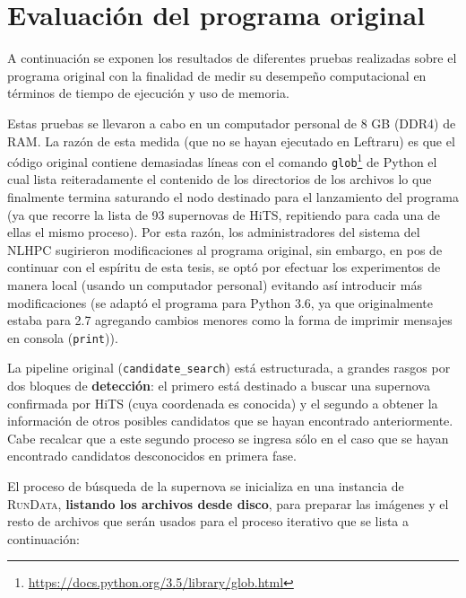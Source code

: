 \chapter{Evaluaci\'on del programa original}
\label{ch:prev_work}

A continuaci\'on se exponen los resultados de diferentes pruebas realizadas sobre el programa original con la finalidad de medir su desempe\~no computacional en t\'erminos de tiempo de ejecuci\'on y uso de memoria.
\bigskip

Estas pruebas se llevaron a cabo en un computador personal de 8 GB (DDR4) de RAM. La raz\'on de esta  medida (que no se hayan ejecutado en Leftraru) es que el c\'odigo original contiene demasiadas l\'ineas con el comando \texttt{glob}\footnote{\url{https://docs.python.org/3.5/library/glob.html}} de Python el cual lista reiteradamente el contenido de los directorios de los archivos lo que finalmente termina saturando el nodo destinado para el lanzamiento del programa (ya que recorre la lista de 93 supernovas de HiTS, repitiendo para cada una de ellas el mismo proceso). Por esta raz\'on, los administradores del sistema del NLHPC sugirieron modificaciones al programa original, sin embargo, en pos de continuar con el esp\'iritu de esta tesis, se opt\'o por efectuar los experimentos de manera local (usando un computador personal) evitando as\'i introducir m\'as modificaciones (se adapt\'o el programa para Python 3.6, ya que originalmente estaba para 2.7 agregando cambios menores como la forma de imprimir mensajes en consola (\texttt{print})).
\bigskip

La pipeline original (\texttt{candidate\_search}) est\'a estructurada, a grandes rasgos por dos bloques de \textbf{detecci\'on}: el primero est\'a destinado a buscar una supernova confirmada por HiTS (cuya coordenada es conocida) y el segundo a obtener la informaci\'on de otros posibles candidatos que se hayan encontrado anteriormente. Cabe recalcar que a este segundo proceso se ingresa s\'olo en el caso que se hayan encontrado candidatos desconocidos en primera fase.
\bigskip

El proceso de b\'usqueda de la supernova se inicializa en una instancia de \textsc{RunData}, \textbf{listando los archivos desde disco}, para preparar las im\'agenes y el resto de archivos que ser\'an usados para el proceso iterativo que se lista a continuaci\'on: 

